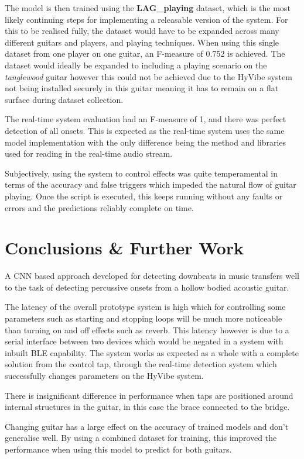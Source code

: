 \documentclass[conference]{IEEEtran}
\begin{document}
The model is then trained using the \textbf{LAG\_playing} dataset, which is the most likely continuing steps for implementing a releasable version of the system. For this to be realised fully, the dataset would have to be expanded across many different guitars and players, and playing techniques. When using this single dataset
from one player on one guitar, an F-measure of 0.752 is achieved. The dataset would ideally be expanded to including a playing scenario on the \emph{tanglewood} guitar however this could not be achieved due to the HyVibe system not being installed securely in this guitar meaning it has to remain on a flat
surface during dataset collection.

The real-time system evaluation had an F-measure of 1, and there was perfect detection of all onsets. This is expected as the real-time system uses the same model implementation with the only difference being the method and libraries used
for reading in the real-time audio stream. 

Subjectively, using the system to control effects was quite temperamental in terms of the accuracy and false triggers which impeded the natural flow of guitar playing. Once the script is executed, this keeps running without any faults or errors and the predictions reliably complete on time.

\section{Conclusions \& Further Work}

A CNN based approach developed for detecting downbeats in music transfers well to the task of detecting percussive onsets from a hollow bodied acoustic guitar.

The latency of the overall prototype system is high which for controlling some parameters such as starting and stopping loops will be much more noticeable than turning on and off effects such as reverb. This latency however is due to a serial interface between two devices which would be 
negated in a system with inbuilt BLE capability. The system works as expected as a whole with a complete solution from the control tap, through the real-time detection system which successfully changes parameters on the HyVibe system.

There is insignificant difference in performance when taps are positioned around internal structures in the guitar, in this case the brace connected to the bridge.

Changing guitar has a large effect on the accuracy of trained models and don't generalise well. By using a combined dataset for training, this improved the performance when using this model to predict for both guitars.
\end{document}
